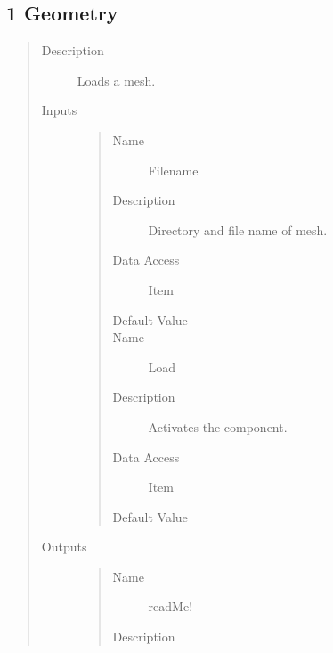 \documentclass[letterpaper,10pt,english]{sphinxmanual}
\begin{document}
\subsection{1 \textbar{} Geometry}
\label{\detokenize{components:geometry}}
\begin{quote}\begin{description}
\item[{Description}] \leavevmode
Loads a mesh.

\item[{Inputs}] \leavevmode\begin{quote}\begin{description}
\item[{Name}] \leavevmode
Filename

\item[{Description}] \leavevmode
Directory and file name of mesh.

\item[{Data Access}] \leavevmode
Item

\item[{Default Value}] \leavevmode
{}

\item[{Name}] \leavevmode
Load

\item[{Description}] \leavevmode
Activates the component.

\item[{Data Access}] \leavevmode
Item

\item[{Default Value}] \leavevmode
{}

\end{description}\end{quote}

\item[{Outputs}] \leavevmode\begin{quote}\begin{description}
\item[{Name}] \leavevmode
readMe!

\item[{Description}] \leavevmode
{}


\end{description}
\end{quote}
\end{description}
\end{quote}
\end{document}
